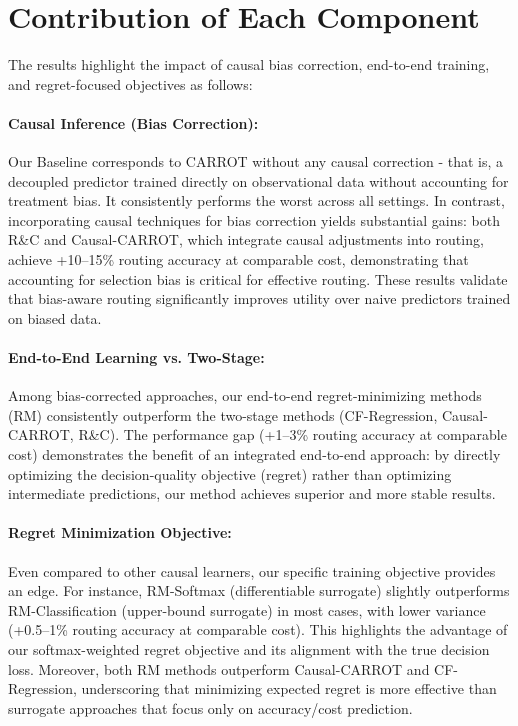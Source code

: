 \documentclass{article}
\theoremstyle{remark}
\begin{document}
\section{Contribution of Each Component}

The results highlight the impact of causal bias correction, end-to-end training, and regret-focused objectives as follows:


    \paragraph{Causal Inference (Bias Correction):} Our Baseline corresponds to CARROT without any causal correction - that is, a decoupled predictor trained directly on observational data without accounting for treatment bias. It consistently performs the worst across all settings. In contrast, incorporating causal techniques for bias correction yields substantial gains: both R\&C and Causal-CARROT, which integrate causal adjustments into routing, achieve +10–15\% routing accuracy at comparable cost, demonstrating that accounting for selection bias is critical for effective routing. These results validate that bias-aware routing significantly improves utility over naive predictors trained on biased data.
    \paragraph{End-to-End Learning vs. Two-Stage:} Among bias-corrected approaches, our end-to-end regret-minimizing methods (RM) consistently outperform the two-stage methods (CF-Regression, Causal-CARROT, R\&C). The performance gap (+1–3\% routing accuracy at comparable cost) demonstrates the benefit of an integrated end-to-end approach: by directly optimizing the decision-quality objective (regret) rather than optimizing intermediate predictions, our method achieves superior and more stable results.
    \paragraph{Regret Minimization Objective:} Even compared to other causal learners, our specific training objective provides an edge. For instance, RM-Softmax (differentiable surrogate) slightly outperforms RM-Classification (upper-bound surrogate) in most cases, with lower variance (+0.5–1\% routing accuracy at comparable cost). This highlights the advantage of our softmax-weighted regret objective and its alignment with the true decision loss. Moreover, both RM methods outperform Causal-CARROT and CF-Regression, underscoring that minimizing expected regret is more effective than surrogate approaches that focus only on accuracy/cost prediction.
\end{document}
